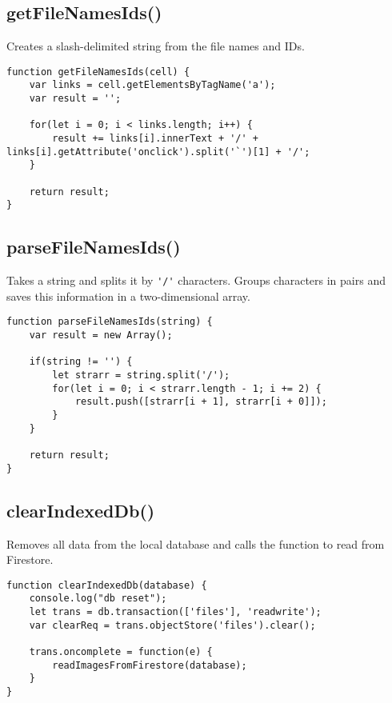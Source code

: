 \documentclass[letterpaper]{article}
\begin{document}
\subsection{getFileNamesIds()}

Creates a slash-delimited string from the file names and IDs.

\begin{lstlisting}[firstnumber=59]
function getFileNamesIds(cell) {
    var links = cell.getElementsByTagName('a');
    var result = '';

    for(let i = 0; i < links.length; i++) {
        result += links[i].innerText + '/' + links[i].getAttribute('onclick').split('`')[1] + '/';
    }

    return result;
}
\end{lstlisting}

\subsection{parseFileNamesIds()}

Takes a string and splits it by \lstinline{'/'} characters.
Groups characters in pairs and saves this information in a two-dimensional array.

\begin{lstlisting}[firstnumber=70]
function parseFileNamesIds(string) {
    var result = new Array();

    if(string != '') {
        let strarr = string.split('/');
        for(let i = 0; i < strarr.length - 1; i += 2) {
            result.push([strarr[i + 1], strarr[i + 0]]);
        }
    }

    return result;
}
\end{lstlisting}

\subsection{clearIndexedDb()}

Removes all data from the local database and calls the function to read from Firestore.

\begin{lstlisting}[firstnumber=83]
function clearIndexedDb(database) {
    console.log("db reset");
    let trans = db.transaction(['files'], 'readwrite');
    var clearReq = trans.objectStore('files').clear();

    trans.oncomplete = function(e) {
        readImagesFromFirestore(database);
    }
}
\end{lstlisting}
\end{document}
